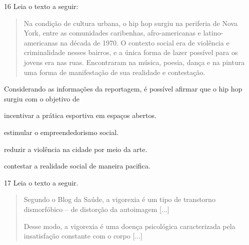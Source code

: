 \num{16}  Leia o texto a seguir:

\begin{quote}
Na condição de cultura urbana, o hip hop surgiu na periferia de Nova
York, entre as comunidades caribenhas, afro-americanas e
latino-americanas na década de 1970. O contexto social era de violência
e criminalidade nesses bairros, e a única forma de lazer possível para
os jovens era nas ruas. Encontraram na música, poesia, dança e na
pintura uma forma de manifestação de sua realidade e contestação.

\end{quote}

Considerando as informações da reportagem, é possível afirmar que o
hip hop surgiu com o objetivo de

\begin{escolha}
\item incentivar a prática esportiva em espaços abertos.

\item estimular o empreendedorismo social.

\item reduzir a violência na cidade por meio da arte.

\item contestar a realidade social de maneira pacifica.
\end{escolha}

\pagebreak
\num{17}  Leia o texto a seguir.

\begin{quote}
Segundo o Blog da Saúde, a vigorexia é um tipo de transtorno dismorfóbico
-- de distorção da autoimagem {[}...{]}

Desse modo, a vigorexia é uma doença psicológica caracterizada pela
insatisfação constante com o corpo {[}...{]}

\end{quote}

